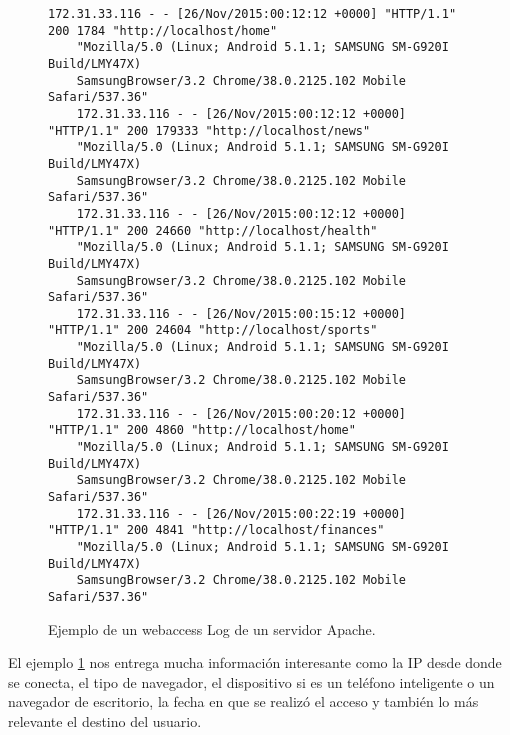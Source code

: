 \begin{figure}[h] 
	\centering
	\begin{lstlisting}[frame=single,basicstyle=\ttfamily\tiny,]
	172.31.33.116 - - [26/Nov/2015:00:12:12 +0000] "HTTP/1.1" 200 1784 "http://localhost/home" 
	"Mozilla/5.0 (Linux; Android 5.1.1; SAMSUNG SM-G920I Build/LMY47X) 
	SamsungBrowser/3.2 Chrome/38.0.2125.102 Mobile Safari/537.36"
	172.31.33.116 - - [26/Nov/2015:00:12:12 +0000] "HTTP/1.1" 200 179333 "http://localhost/news" 
	"Mozilla/5.0 (Linux; Android 5.1.1; SAMSUNG SM-G920I Build/LMY47X) 
	SamsungBrowser/3.2 Chrome/38.0.2125.102 Mobile Safari/537.36"
	172.31.33.116 - - [26/Nov/2015:00:12:12 +0000] "HTTP/1.1" 200 24660 "http://localhost/health" 
	"Mozilla/5.0 (Linux; Android 5.1.1; SAMSUNG SM-G920I Build/LMY47X) 
	SamsungBrowser/3.2 Chrome/38.0.2125.102 Mobile Safari/537.36"
	172.31.33.116 - - [26/Nov/2015:00:15:12 +0000] "HTTP/1.1" 200 24604 "http://localhost/sports" 
	"Mozilla/5.0 (Linux; Android 5.1.1; SAMSUNG SM-G920I Build/LMY47X) 
	SamsungBrowser/3.2 Chrome/38.0.2125.102 Mobile Safari/537.36"
	172.31.33.116 - - [26/Nov/2015:00:20:12 +0000] "HTTP/1.1" 200 4860 "http://localhost/home" 
	"Mozilla/5.0 (Linux; Android 5.1.1; SAMSUNG SM-G920I Build/LMY47X) 
	SamsungBrowser/3.2 Chrome/38.0.2125.102 Mobile Safari/537.36"
	172.31.33.116 - - [26/Nov/2015:00:22:19 +0000] "HTTP/1.1" 200 4841 "http://localhost/finances" 
	"Mozilla/5.0 (Linux; Android 5.1.1; SAMSUNG SM-G920I Build/LMY47X) 
	SamsungBrowser/3.2 Chrome/38.0.2125.102 Mobile Safari/537.36"
	\end{lstlisting}
	
	
	
	\caption{Ejemplo de un webaccess Log de un servidor Apache.}
	\label{fig:accesslog-apache-teleton}
\end{figure}


  El ejemplo \ref{fig:accesslog-apache-teleton} nos entrega mucha información interesante como la {IP} desde donde se conecta, el tipo de navegador, el dispositivo si es un teléfono inteligente o un navegador de escritorio, la fecha en que se realizó el acceso y también lo más relevante el destino del usuario.
  
  
  
  